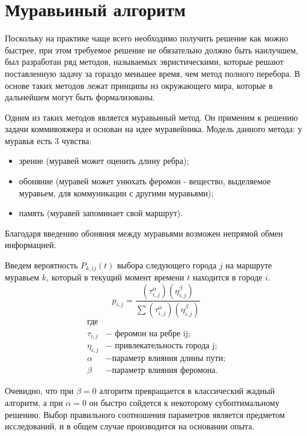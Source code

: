 \documentclass[a4paper,12pt]{report}
\begin{document}
\section{Муравьиный алгоритм}

\hspace{0.6cm}
Поскольку на практике чаще всего необходимо получить решение как можно быстрее, при этом требуемое решение не обязательно должно быть наилучшем, был разработан ряд методов, называемых эвристическими, которые решают поставленную задачу за гораздо меньшее время, чем метод полного перебора. В основе таких методов лежат принципы из окружающего мира, которые в дальнейшем могут быть формализованы.

Одним из таких методов является муравьиный метод. Он применим к решению задачи коммивояжера и основан на идее муравейника. Модель данного метода: у муравья есть 3 чувства:
\begin{itemize}
\item зрение (муравей может оценить длину ребра);
\item обоняние (муравей может унюхать феромон - вещество, выделяемое муравьем, для коммуникации с другими муравьями);
\item память (муравей запоминает свой маршрут).
\end{itemize}
Благодаря введению обоняния между муравьями возможен непрямой обмен информацией.

Введем вероятность $P_{k, ij}(t)$ выбора следующего города $j$ на маршруте муравьем $k$, который в текущий момент времени $t$ находится в городе $i$.
\begin{equation}\label{form:way} 
 p_{i,j}={\frac {(\tau _{i,j}^{\alpha })(\eta _{i,j}^{\beta })}{\sum (\tau _{i,j}^{\alpha })(\eta _{i,j}^{\beta })}}
 \end{equation}
 \begin{align*}
    \text{где} \\
   \tau _{i,j} &- \text{ феромон на ребре ij;} \\
    \eta _{i,j} &- \text{ привлекательность города j;} \\
    \alpha &- \text{параметр влияния длины пути;} \\
    \beta &- \text{параметр влияния феромона.}
\end{align*}

Очевидно, что при $\beta = 0$ алгоритм превращается в классический жадный алгоритм, а при $\alpha = 0$ он быстро сойдется к некоторому субоптимальному решению. Выбор правильного соотношения параметров является предметом исследований, и в общем случае производится на основании опыта.
\end{document}

